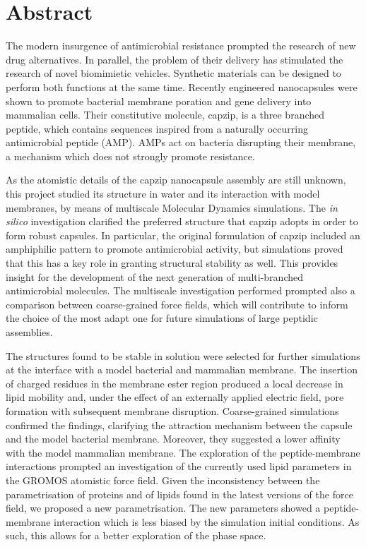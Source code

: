 \clearpage
\thispagestyle{empty}
\chapter*{Abstract}


\begin{onehalfspacing}

\noindent
%
The modern insurgence of antimicrobial resistance prompted the research of new drug alternatives. In parallel, the problem of their delivery has stimulated the research of novel biomimietic vehicles.
%
Synthetic materials can be designed to perform both functions at the same time. Recently engineered nanocapsules were shown to promote bacterial membrane poration and gene delivery into mammalian cells. Their constitutive molecule, capzip, is a three branched peptide, which contains sequences inspired from a naturally occurring antimicrobial peptide (AMP). AMPs act on bacteria disrupting their membrane, a mechanism which does not strongly promote resistance.

As the atomistic details of the capzip nanocapsule assembly are still unknown, this project studied its structure in water and its interaction with model membranes, by means of multiscale Molecular Dynamics simulations. 
%
The \emph{in silico} investigation clarified the preferred structure that capzip adopts in order to form robust capsules.
In particular, the original formulation of capzip included an amphiphilic pattern to promote antimicrobial activity, but simulations proved that this has a key role in granting structural stability as well. This provides insight for the development of the next generation of multi-branched antimicrobial molecules.
%
The multiscale investigation performed prompted also a comparison between coarse-grained force fields, which will contribute to inform the choice of the most adapt one for future simulations of large peptidic assemblies.

The structures found to be stable in solution were selected for further simulations at the interface with a model bacterial and mammalian membrane.
%
The insertion of charged residues in the membrane ester region produced a local decrease in lipid mobility and, under the effect of an externally applied electric field, pore formation with subsequent membrane disruption.
%
Coarse-grained simulations confirmed the findings, clarifying the attraction mechanism between the capsule and the model bacterial membrane. Moreover, they suggested a lower affinity with the model mammalian membrane.
%
The exploration of the peptide-membrane interactions prompted an investigation of the currently used lipid parameters in the GROMOS atomistic force field. Given the inconsistency between the parametrisation of proteins and of lipids found in the latest versions of the force field, we proposed a new parametrisation. The new parameters showed a peptide-membrane interaction which is less biased by the simulation initial conditions. As such, this allows for a better exploration of the phase space.


\end{onehalfspacing}
